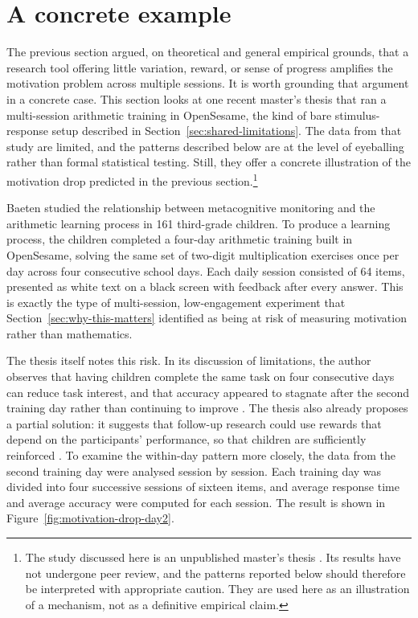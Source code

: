 \section{A concrete example}
\label{sec:bellon-studies}
 
The previous section argued, on theoretical and general empirical grounds, that a research tool offering little variation, reward, or sense of progress amplifies the motivation problem across multiple sessions. It is worth grounding that argument in a concrete case. This section looks at one recent master's thesis that ran a multi-session arithmetic training in OpenSesame, the kind of bare stimulus-response setup described in Section~\ref{sec:shared-limitations}. The data from that study are limited, and the patterns described below are at the level of eyeballing rather than formal statistical testing. Still, they offer a concrete illustration of the motivation drop predicted in the previous section.\footnote{The study discussed here is an unpublished master's thesis \cite{baeten2025}. Its results have not undergone peer review, and the patterns reported below should therefore be interpreted with appropriate caution. They are used here as an illustration of a mechanism, not as a definitive empirical claim.}
 
Baeten \cite{baeten2025} studied the relationship between metacognitive monitoring and the arithmetic learning process in 161 third-grade children. To produce a learning process, the children completed a four-day arithmetic training built in OpenSesame, solving the same set of two-digit multiplication exercises once per day across four consecutive school days. Each daily session consisted of 64 items, presented as white text on a black screen with feedback after every answer. This is exactly the type of multi-session, low-engagement experiment that Section~\ref{sec:why-this-matters} identified as being at risk of measuring motivation rather than mathematics.
 
The thesis itself notes this risk. In its discussion of limitations, the author observes that having children complete the same task on four consecutive days can reduce task interest, and that accuracy appeared to stagnate after the second training day rather than continuing to improve \cite{baeten2025}. The thesis also already proposes a partial solution: it suggests that follow-up research could use rewards that depend on the participants' performance, so that children are sufficiently reinforced \cite{baeten2025}. To examine the within-day pattern more closely, the data from the second training day were analysed session by session. Each training day was divided into four successive sessions of sixteen items, and average response time and average accuracy were computed for each session. The result is shown in Figure~\ref{fig:motivation-drop-day2}.
 
